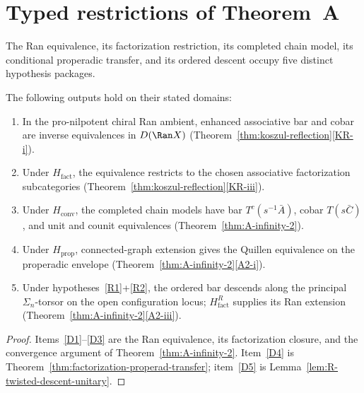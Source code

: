 \section{Typed restrictions of Theorem~A}\label{sec:ainf2-downstream}

The Ran equivalence, its factorization restriction, its completed
chain model, its conditional properadic transfer, and its ordered
descent occupy five distinct hypothesis packages.

\begin{corollary}
\label{cor:ainf2-downstream-list}
The following outputs hold on their stated domains:
\begin{enumerate}[label=\textup{(D\arabic*)}]
\item \label{D1} In the pro-nilpotent chiral Ran ambient, enhanced
associative bar and cobar are inverse equivalences in $D(\Ran X)$
\textup{(}Theorem~\ref{thm:koszul-reflection}\ref{KR-i}\textup{)}.
\item \label{D2} Under $H_{\mathrm{fact}}$, the equivalence restricts
to the chosen associative factorization subcategories
\textup{(}Theorem~\ref{thm:koszul-reflection}\ref{KR-iii}\textup{)}.
\item \label{D3} Under $H_{\mathrm{conv}}$, the completed chain models
have bar $T^c(s^{-1}\bar A)$, cobar $T(s\bar C)$, and unit and counit
equivalences \textup{(}Theorem~\ref{thm:A-infinity-2}\textup{)}.
\item \label{D4} Under $H_{\mathrm{prop}}$, connected-graph extension
gives the Quillen equivalence on the properadic envelope
\textup{(}Theorem~\ref{thm:A-infinity-2}\ref{A2-i}\textup{)}.
\item \label{D5} Under hypotheses~\ref{R1}+\ref{R2}, the ordered bar
descends along the principal $\Sigma_n$-torsor on the open
configuration locus; $H_{\mathrm{fact}}^{R}$ supplies its Ran
extension \textup{(}Theorem~\ref{thm:A-infinity-2}\ref{A2-iii}\textup{)}.
\end{enumerate}
\end{corollary}

\begin{proof}
Items~\ref{D1}--\ref{D3} are the Ran equivalence, its factorization
closure, and the convergence argument of
Theorem~\ref{thm:A-infinity-2}.  Item~\ref{D4} is
Theorem~\ref{thm:factorization-properad-transfer}; item~\ref{D5} is
Lemma~\ref{lem:R-twisted-descent-unitary}.
\end{proof}

